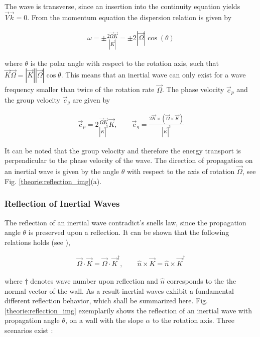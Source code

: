 The wave is transverse, since an insertion into the continuity equation yields $\vec{V}\vec{k} = 0$.
From the momentum equation the dispersion relation is given by

\begin{align}
    \label{theorie:eq_rot_dispersion}
    \omega = \pm \frac{ 2\vec{\Omega}\vec{K}}{|\vec{K}|} = \pm 2|\vec{\Omega}|\cos(\theta)
\end{align}

where $\theta$ is the polar angle with respect to the rotation axis,
such that $\vec{K}\vec{\Omega} = |\vec{K}||\vec{\Omega}|\cos{\theta}$.
This means that an inertial wave can only exist for a wave frequency smaller than twice of the rotation rate $\vec{\Omega}$.
The phase velocity $\vec{c}_p$ and the group velocity $\vec{c}_g$ are given by

\begin{align}
    \vec{c}_p = 2 \frac{\vec{\Omega} \vec{K} }{|\vec{K}|^3} \vec{K}, \qquad
    \vec{c}_g = \frac{2 \vec{K} \times (\vec{\Omega} \times \vec{K})}{|\vec{K}|^3}
\end{align}

\clearpage


It can be noted that the group velocity and therefore the energy transport is perpendicular to the phase velocity of the wave.
The direction of propagation on an inertial wave is given by the angle $\theta$ with respect to the axis of rotation $\vec{\Omega}$,
see Fig. \ref{theorie:reflection_img}(a).


\subsubsection{Reflection of Inertial Waves}
\label{theorie:sec:iwreflec}

The reflection of an inertial wave contradict's snells law, since the propagation angle $\theta$ is preserved upon a reflection.
It can be shown that the following relations holds (see \cite{Beardsley1970}),

\begin{align}
\label{theorie:reflections}
\vec{\Omega}\cdot \vec{K} =  \vec{\Omega}\cdot\vec{K}^\dagger, \qquad \hat{n} \times \vec{K} = \hat{n} \times \vec{K}^\dagger
\end{align}

where $\dagger$ denotes wave number upon reflection and $\hat{n}$ corresponds to the the normal vector of the wall.
As a result inertial waves exhibit a fundamental different reflection behavior, which shall be summarized here.
Fig. \ref{theorie:reflection_img} exemplarily shows the reflection of an inertial wave with propagation angle $\theta$,
on a wall with the slope $\alpha$ to the rotation axis. Three scenarios exist \citep{Clausen2011}:

